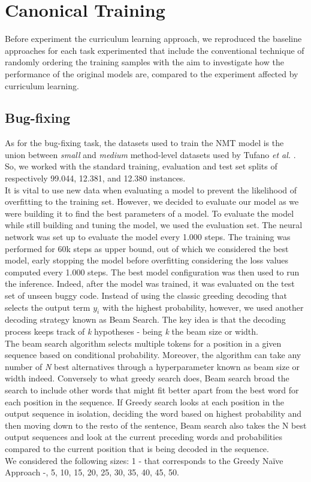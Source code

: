 \section{Canonical Training}
Before experiment the curriculum learning approach, we reproduced the baseline approaches for each task experimented
that include the conventional technique of randomly ordering the training samples with the aim to investigate how the performance 
of the original models are, compared to the experiment affected by curriculum learning.
\subsection{Bug-fixing}
As for the bug-fixing task, the datasets used to train the NMT model is the union between \textit{small} and \textit{medium} method-level datasets
used by Tufano \textit{et al.} \cite{Tufano2019}. So, we worked with the standard training, evaluation and test set splits of respectively
99.044, 12.381, and 12.380 instances.\\
It is vital to use new data when evaluating a model to prevent the likelihood of overfitting to the 
training set. However, we decided to evaluate our model as we were building it to find the best parameters of 
a model. To evaluate the model while still building and tuning the model, we used the evaluation set. The neural network
was set up to evaluate the model every 1.000 steps. The training was performed for 60k steps as upper bound, 
out of which we considered the best model, early stopping the model before overfitting considering the loss values computed every 1.000 steps.
The best model configuration was then used to run the inference.
Indeed, after the model was trained, it was evaluated on the test set of unseen buggy code. 
Instead of using the classic greeding decoding that selects the output term \(y_i\) with the highest probability, however, we used another decoding
strategy known as Beam Search. 
The key idea is that the decoding process keeps track of \textit{k}
hypotheses - being \textit{k} the beam size or width.\\
The beam search algorithm selects multiple tokens for a position in a given sequence based on conditional probability. Moreover, the algorithm
can take any number of \textit{N} best alternatives through a hyperparameter known as beam size or width indeed. Conversely to what greedy search does, 
Beam search broad the search to include other words that might fit better apart from the best word for each position in the sequence.
If Greedy search looks at each position in the output sequence in isolation, deciding the word based on highest probability and then moving down to the resto of the sentence,
Beam search also takes the N best output sequences and look at the current preceding words and probabilities compared to the current position that is being decoded in the sequence.\\
We considered the following sizes: 1 - that corresponds to the Greedy Naïve Approach -, 5, 10, 15, 20, 25, 30, 35, 40, 45, 50.


